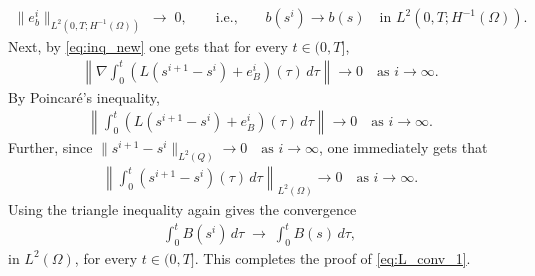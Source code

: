 \documentclass[review,11pt]{article}
\numberwithin{equation}{section}
\def \Om {\Omega}
\begin{document}
\begin{align}
    \|e_b^i\|_{L^2(0,T;H^{-1}(\Omega))}  \;\to\; 0,
\qquad\text{i.e.,}\qquad
b(s^i)\to b(s) \quad \text{in } L^2(0,T;H^{-1}(\Omega)).\label{eq:bconv_new}
\end{align}
Next, by \eqref{eq:inq_new} one gets that for every $t\in(0,T]$,
\begin{align}
\left\|\nabla \int_0^t \left(L(s^{i+1}-s^i)+e_B^i\right)(\tau)\,d\tau\right\| \to 0 \quad \text{as } i \to \infty.
\end{align}
By Poincar\'e's inequality,
\begin{align}
\left\|\int_0^t \left(L(s^{i+1} - s^i) + e_B^i\right)(\tau)
\,d\tau\right\| \to 0 \quad \text{as } i \to \infty.
\end{align}
Further, since $\|s^{i+1}-s^i\|_{L^2(Q)} \to 0 \quad \text{as } i \to \infty$, one immediately gets that
\begin{align}
 \left\|\int_0^t (s^{i+1}-s^i)(\tau)\,d\tau\right\|_{L^2(\Omega)}\to 0 \quad \text{as } i \to \infty.  
\end{align}
 Using the triangle inequality again gives the convergence
\begin{align}
    \int_0^t B(s^i)\,d\tau \;\longrightarrow\; \int_0^t B(s)\,d\tau,
\end{align}
in $L^2(\Omega)$, for every $t\in (0,T]$. This completes the proof of \eqref{eq:L_conv_1}.





\end{document}
